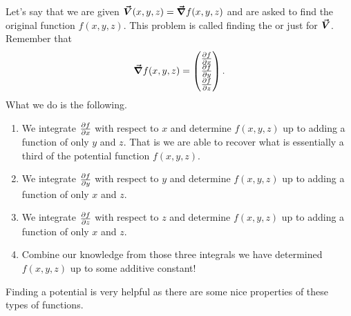                    	        Let's say that we are given $\boldsymbol{\vec{V}}(x,y,z)=\boldsymbol{\vec{\nabla}} f(x,y,z)$ and are asked to find the original function $f(x,y,z)$.  This problem is called finding the  or just  for $\boldsymbol{\vec{V}}$.  Remember that
                   	        \[
                   	        \boldsymbol{\vec{\nabla}} f(x,y,z) = \begin{pmatrix} \frac{\partial f}{\partial x} \\ \frac{\partial f}{\partial y} \\ \frac{\partial f}{\partial z} \end{pmatrix}.
                   	        \]
                   	        What we do is the following.
                   	        \begin{enumerate}[1.]
                   	            \item We integrate $\frac{\partial f}{\partial x}$ with respect to $x$ and determine $f(x,y,z)$ up to adding a function of only $y$ and $z$.  That is we are able to recover what is essentially a third of the potential function $f(x,y,z)$.
                   	            \item We integrate $\frac{\partial f}{\partial y}$ with respect to $y$ and determine $f(x,y,z)$ up to adding a function of only $x$ and $z$.
                   	            \item We integrate $\frac{\partial f}{\partial z}$ with respect to $z$ and determine $f(x,y,z)$ up to adding a function of only $x$ and $z$.
                   	            \item Combine our knowledge from those three integrals we have determined $f(x,y,z)$ up to some additive constant!
                   	        \end{enumerate}
                   	        Finding a potential is very helpful as there are some nice properties of these types of functions.

